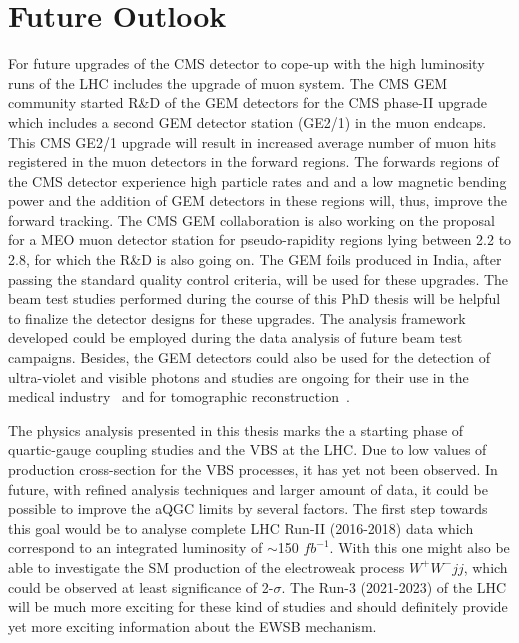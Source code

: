 \section{Future Outlook} %
\label{sec:future_outlook}
For future upgrades of the CMS detector to cope-up with the high luminosity runs of the LHC includes the upgrade of muon system. The CMS GEM community started R\&D of the GEM detectors for the CMS phase-II upgrade which  includes a  second GEM detector station (GE2/1) in the muon endcaps. This CMS GE2/1 upgrade will result  in increased  average number of muon hits registered in the muon detectors in the forward regions. The forwards regions of the CMS detector experience  high particle rates and and a low magnetic bending power and the addition of GEM detectors in these regions will, thus, improve the forward tracking. 
The CMS GEM collaboration is also working on the proposal for a MEO muon detector station for pseudo-rapidity regions lying between 2.2 to 2.8, for which the R\&D is also going on. 
The GEM foils produced in India, after passing the standard quality control criteria, will be used for these upgrades. The beam test studies performed during the course of this PhD thesis will be helpful to finalize the detector designs for these upgrades. The analysis framework developed could be employed during the data analysis of future beam test campaigns.  
Besides, the GEM detectors could also be used for the detection of ultra-violet and visible photons and studies are ongoing for their use in the medical industry~\cite{Wallmark2001,Tsyganov2008,Remillard2000} and for tomographic reconstruction~\cite{Gnanvo2010}. 

The physics analysis presented in this thesis marks the a starting phase of quartic-gauge coupling studies and the VBS at the LHC. Due to low values of production cross-section for the VBS processes, it has yet not been observed. In future, with refined analysis techniques and larger amount of data, it could be possible to improve the aQGC limits by several factors. The first step towards this goal would be to analyse complete LHC Run-II (2016-2018) data which correspond to an integrated luminosity of $\sim$150 $fb^{-1}$.
With this one might also be able to investigate the SM production of the electroweak process $W^+W^-jj$, which could be observed at least significance of 2-$\sigma$.
The Run-3 (2021-2023) of the LHC will be much more exciting for these kind of studies and should definitely provide yet more exciting information about the EWSB mechanism.

